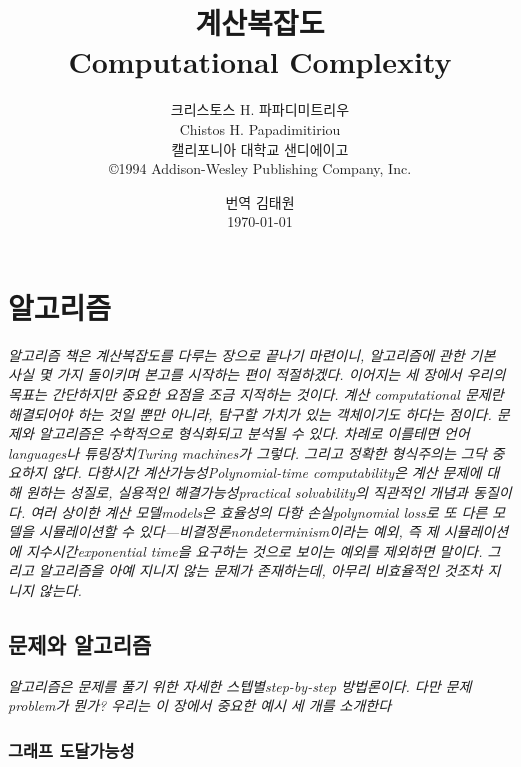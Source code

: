 \documentclass[a4paper,chapter,kosection,atbegshi,itemph]{oblivoir}
\title{계산복잡도\\Computational Complexity}
\author{크리스토스 H. 파파디미트리우\\
Chistos H. Papadimitiriou\\
\small 캘리포니아 대학교 샌디에이고\\
\small \copyright 1994 Addison-Wesley Publishing Company, Inc.}
\date{번역 김태원\\\today}
\begin{document}
\begin{titlingpage}
  \maketitle
\end{titlingpage}
\frontmatter
\tableofcontents
\mainmatter
\renewcommand{\partpageend}{}
\part{알고리즘}
\vspace{5\baselineskip}\noindent
\emph{알고리즘 책은 계산복잡도를 다루는 장으로 끝나기 마련이니, 알고리즘에 관한
기본 사실 몇 가지 돌이키며 본고를 시작하는 편이 적절하겠다. 이어지는 세 장에서
우리의 목표는 간단하지만 중요한 요점을 조금 지적하는 것이다. 계산{\footnotesize
computational} 문제란 해결되어야 하는 것일 뿐만 아니라, 탐구할 가치가 있는
객체이기도 하다는 점이다. 문제와 알고리즘은 수학적으로 형식화되고 분석될 수 있다.
차례로 이를테면 언어{\footnotesize languages}나 튜링장치{\footnotesize Turing
machines}가 그렇다. 그리고 정확한 형식주의는 그닥 중요하지 않다. 다항시간
계산가능성{\footnotesize Polynomial-time computability}은 계산 문제에 대해 원하는
성질로, 실용적인 해결가능성{\footnotesize practical solvability}의 직관적인
개념과 동질이다. 여러 상이한 계산 모델{\footnotesize models}은 효율성의 다항
손실{\footnotesize polynomial loss}로 또 다른 모델을 시뮬레이션할 수 
있다---비결정론{\footnotesize nondeterminism}이라는 예외, 즉 제 시뮬레이션에 
지수시간{\footnotesize exponential time}을 요구하는 것으로 보이는 예외를 제외하면
말이다. 그리고 알고리즘을 아예 지니지 않는 문제가 존재하는데, 아무리 비효율적인
것조차 지니지 않는다.
}
\cleardoublepage
\chapter{문제와 알고리즘}
\emph{알고리즘은 문제를 풀기 위한 자세한 스텝별{\footnotesize step-by-step}
방법론이다. 다만 문제{\footnotesize problem}가 뭔가? 우리는 이 장에서 
중요한 예시 세 개를 소개한다}
\section{그래프 도달가능성}
\end{document}
